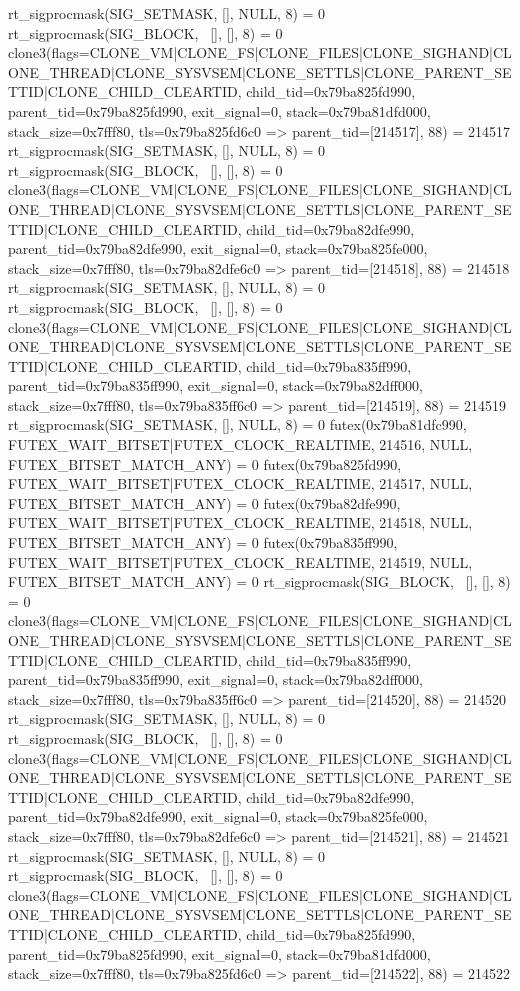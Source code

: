 \begin{breakableverbatim}
rt_sigprocmask(SIG_SETMASK, [], NULL, 8) = 0
rt_sigprocmask(SIG_BLOCK, ~[], [], 8)   = 0
clone3({flags=CLONE_VM|CLONE_FS|CLONE_FILES|CLONE_SIGHAND|CLONE_THREAD|CLONE_SYSVSEM|CLONE_SETTLS|CLONE_PARENT_SETTID|CLONE_CHILD_CLEARTID, child_tid=0x79ba825fd990, parent_tid=0x79ba825fd990, exit_signal=0, stack=0x79ba81dfd000, stack_size=0x7fff80, tls=0x79ba825fd6c0} => {parent_tid=[214517]}, 88) = 214517
rt_sigprocmask(SIG_SETMASK, [], NULL, 8) = 0
rt_sigprocmask(SIG_BLOCK, ~[], [], 8)   = 0
clone3({flags=CLONE_VM|CLONE_FS|CLONE_FILES|CLONE_SIGHAND|CLONE_THREAD|CLONE_SYSVSEM|CLONE_SETTLS|CLONE_PARENT_SETTID|CLONE_CHILD_CLEARTID, child_tid=0x79ba82dfe990, parent_tid=0x79ba82dfe990, exit_signal=0, stack=0x79ba825fe000, stack_size=0x7fff80, tls=0x79ba82dfe6c0} => {parent_tid=[214518]}, 88) = 214518
rt_sigprocmask(SIG_SETMASK, [], NULL, 8) = 0
rt_sigprocmask(SIG_BLOCK, ~[], [], 8)   = 0
clone3({flags=CLONE_VM|CLONE_FS|CLONE_FILES|CLONE_SIGHAND|CLONE_THREAD|CLONE_SYSVSEM|CLONE_SETTLS|CLONE_PARENT_SETTID|CLONE_CHILD_CLEARTID, child_tid=0x79ba835ff990, parent_tid=0x79ba835ff990, exit_signal=0, stack=0x79ba82dff000, stack_size=0x7fff80, tls=0x79ba835ff6c0} => {parent_tid=[214519]}, 88) = 214519
rt_sigprocmask(SIG_SETMASK, [], NULL, 8) = 0
futex(0x79ba81dfc990, FUTEX_WAIT_BITSET|FUTEX_CLOCK_REALTIME, 214516, NULL, FUTEX_BITSET_MATCH_ANY) = 0
futex(0x79ba825fd990, FUTEX_WAIT_BITSET|FUTEX_CLOCK_REALTIME, 214517, NULL, FUTEX_BITSET_MATCH_ANY) = 0
futex(0x79ba82dfe990, FUTEX_WAIT_BITSET|FUTEX_CLOCK_REALTIME, 214518, NULL, FUTEX_BITSET_MATCH_ANY) = 0
futex(0x79ba835ff990, FUTEX_WAIT_BITSET|FUTEX_CLOCK_REALTIME, 214519, NULL, FUTEX_BITSET_MATCH_ANY) = 0
rt_sigprocmask(SIG_BLOCK, ~[], [], 8)   = 0
clone3({flags=CLONE_VM|CLONE_FS|CLONE_FILES|CLONE_SIGHAND|CLONE_THREAD|CLONE_SYSVSEM|CLONE_SETTLS|CLONE_PARENT_SETTID|CLONE_CHILD_CLEARTID, child_tid=0x79ba835ff990, parent_tid=0x79ba835ff990, exit_signal=0, stack=0x79ba82dff000, stack_size=0x7fff80, tls=0x79ba835ff6c0} => {parent_tid=[214520]}, 88) = 214520
rt_sigprocmask(SIG_SETMASK, [], NULL, 8) = 0
rt_sigprocmask(SIG_BLOCK, ~[], [], 8)   = 0
clone3({flags=CLONE_VM|CLONE_FS|CLONE_FILES|CLONE_SIGHAND|CLONE_THREAD|CLONE_SYSVSEM|CLONE_SETTLS|CLONE_PARENT_SETTID|CLONE_CHILD_CLEARTID, child_tid=0x79ba82dfe990, parent_tid=0x79ba82dfe990, exit_signal=0, stack=0x79ba825fe000, stack_size=0x7fff80, tls=0x79ba82dfe6c0} => {parent_tid=[214521]}, 88) = 214521
rt_sigprocmask(SIG_SETMASK, [], NULL, 8) = 0
rt_sigprocmask(SIG_BLOCK, ~[], [], 8)   = 0
clone3({flags=CLONE_VM|CLONE_FS|CLONE_FILES|CLONE_SIGHAND|CLONE_THREAD|CLONE_SYSVSEM|CLONE_SETTLS|CLONE_PARENT_SETTID|CLONE_CHILD_CLEARTID, child_tid=0x79ba825fd990, parent_tid=0x79ba825fd990, exit_signal=0, stack=0x79ba81dfd000, stack_size=0x7fff80, tls=0x79ba825fd6c0} => {parent_tid=[214522]}, 88) = 214522

\end{breakableverbatim}
